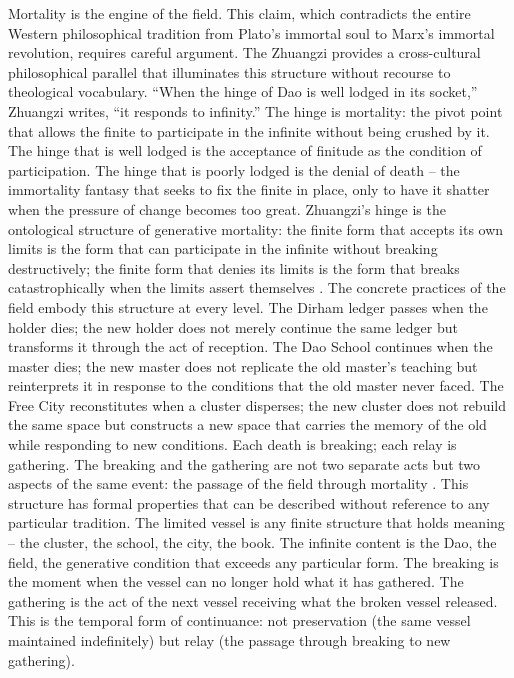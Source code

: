 Mortality is the engine of the field. This claim, which contradicts the entire Western philosophical tradition from Plato’s immortal soul to Marx’s immortal revolution, requires careful argument. The Zhuangzi provides a cross-cultural philosophical parallel that illuminates this structure without recourse to theological vocabulary. “When the hinge of Dao is well lodged in its socket,” Zhuangzi writes, “it responds to infinity.” The hinge is mortality: the pivot point that allows the finite to participate in the infinite without being crushed by it. The hinge that is well lodged is the acceptance of finitude as the condition of participation. The hinge that is poorly lodged is the denial of death – the immortality fantasy that seeks to fix the finite in place, only to have it shatter when the pressure of change becomes too great. Zhuangzi’s hinge is the ontological structure of generative mortality: the finite form that accepts its own limits is the form that can participate in the infinite without breaking destructively; the finite form that denies its limits is the form that breaks catastrophically when the limits assert themselves \cite[p.~2528]{zhuangzi_2009}. The concrete practices of the field embody this structure at every level. The Dirham ledger passes when the holder dies; the new holder does not merely continue the same ledger but transforms it through the act of reception. The Dao School continues when the master dies; the new master does not replicate the old master’s teaching but reinterprets it in response to the conditions that the old master never faced. The Free City reconstitutes when a cluster disperses; the new cluster does not rebuild the same space but constructs a new space that carries the memory of the old while responding to new conditions. Each death is breaking; each relay is gathering. The breaking and the gathering are not two separate acts but two aspects of the same event: the passage of the field through mortality \cite[pp.~185-212]{hui_2017}. This structure has formal properties that can be described without reference to any particular tradition. The limited vessel is any finite structure that holds meaning – the cluster, the school, the city, the book. The infinite content is the Dao, the field, the generative condition that exceeds any particular form. The breaking is the moment when the vessel can no longer hold what it has gathered. The gathering is the act of the next vessel receiving what the broken vessel released. This is the temporal form of continuance: not preservation (the same vessel maintained indefinitely) but relay (the passage through breaking to new gathering).

